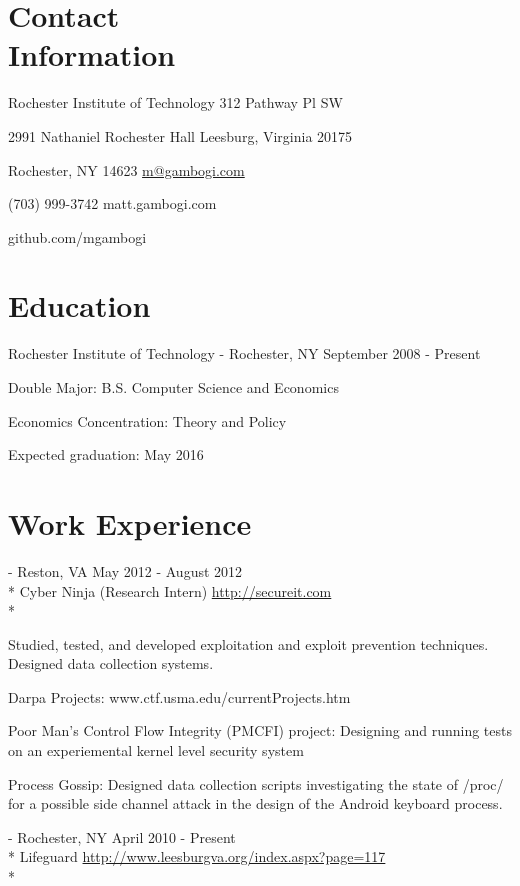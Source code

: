\documentclass[letter,margin,line]{resume}
\newcommand{\rurl}[1]{\hfill {\footnotesize \url{#1}}}
\newcommand{\rdate}[1]{\hfill {\small #1}}
\renewcommand{\employer}[5]{\item[#1] - #2 \rdate{#3} \\* #4 \rurl{#5} \\*}
\begin{document}
\begin{resume}
\section{\mysidestyle Contact \\ Information} \vspace{2mm}
	\begin{asparablank}
		\item Rochester Institute of Technology \hfill 312 Pathway Pl SW
		\item 2991 Nathaniel Rochester Hall \hfill Leesburg, Virginia 20175
		\item Rochester, NY 14623 \hfill
		\href{mailto:m@gambogi.com}{m@gambogi.com}
		\item (703) 999-3742 \hfill {matt.gambogi.com}
		\item \hfill github.com/mgambogi
	\end{asparablank}

\section{\mysidestyle Education}
	\begin{compactdesc}
		\item[Rochester Institute of Technology] - Rochester, NY \rdate{September 2008 - Present}
		\begin{compactitem} { \small
			\item Double Major: B.S. Computer Science and Economics 
			\item Economics Concentration: Theory and Policy
			\item Expected graduation: May 2016
		} \end{compactitem}
	\end{compactdesc}

\section{\mysidestyle Work Experience}
	\begin{asparadesc}
		\employer{SecureIT}{Reston, VA}{May 2012 - August 2012}{Cyber Ninja (Research Intern)}{http://secureit.com}

		\small
		Studied, tested, and developed exploitation and exploit prevention techniques. Designed data collection systems.
		\item Darpa Projects: \hfill www.ctf.usma.edu/currentProjects.htm
			\item Poor Man’s Control Flow Integrity (PMCFI) project: Designing and running tests on an experiemental kernel level security system
			\item Process Gossip: Designed data collection scripts investigating the state of /proc/ for a possible side channel attack in the design of the Android keyboard process.
		\normalsize
		\\
        \employer{Town of Leesburg, Parks and Recreation}{Rochester, NY}{April 2010 - Present}{Lifeguard}{http://www.leesburgva.org/index.aspx?page=117}


\end{asparadesc}
\end{resume}
\end{document}
